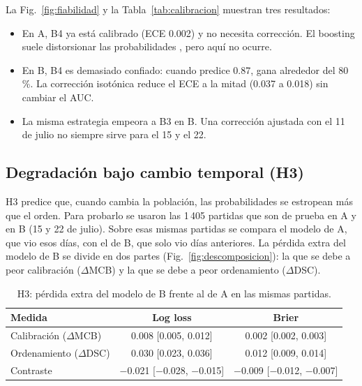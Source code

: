 La Fig.~\ref{fig:fiabilidad} y la Tabla~\ref{tab:calibracion} muestran tres
resultados:
\begin{itemize}
  \item En A, B4 ya está calibrado (ECE 0.002) y no necesita corrección. El
        boosting suele distorsionar las probabilidades
        \cite{niculescumizil_probabilities_2005}, pero aquí no ocurre.
  \item En B, B4 es demasiado confiado: cuando predice 0.87, gana alrededor
        del 80\,\%. La corrección isotónica reduce el ECE a la mitad
        (0.037 a 0.018) sin cambiar el AUC.
  \item La misma estrategia empeora a B3 en B. Una corrección ajustada con
        el 11 de julio no siempre sirve para el 15 y el 22.
\end{itemize}

\subsection{Degradación bajo cambio temporal (H3)}
\label{subsec:resh3}

H3 predice que, cuando cambia la población, las probabilidades se
estropean más que el orden. Para probarlo se usaron las 1\,405 partidas que
son de prueba en A y en B (15 y 22 de julio). Sobre esas mismas partidas se
compara el modelo de A, que vio esos días, con el de B, que solo vio días
anteriores. La pérdida extra del modelo de B se divide en dos partes
(Fig.~\ref{fig:descomposicion}): la que se debe a peor calibración
($\Delta$MCB) y la que se debe a peor ordenamiento ($\Delta$DSC).

\begin{table}[!t]
\centering
\caption{H3: pérdida extra del modelo de B frente al de A en las mismas
partidas.}
\label{tab:h3}
\footnotesize
\setlength{\tabcolsep}{3pt}
\begin{tabular}{@{}lcc@{}}
\toprule
\textbf{Medida} & \textbf{Log loss} & \textbf{Brier}\\
\midrule
Calibración ($\Delta$MCB) & 0.008 {\scriptsize[0.005, 0.012]} & 0.002 {\scriptsize[0.002, 0.003]}\\
Ordenamiento ($\Delta$DSC) & 0.030 {\scriptsize[0.023, 0.036]} & 0.012 {\scriptsize[0.009, 0.014]}\\
Contraste & $-$0.021 {\scriptsize[$-$0.028, $-$0.015]} & $-$0.009 {\scriptsize[$-$0.012, $-$0.007]}\\
\bottomrule
\end{tabular}
\end{table}

